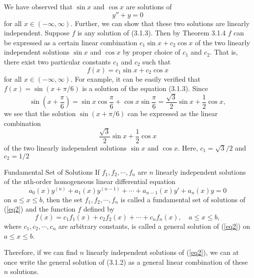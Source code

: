 \begin{example}{}{}
    We have observed that $\sin x$ and $\cos x$ are solutions of
    \begin{equation}
        y'' + y = 0
    \end{equation}
    for all $x \in (-\infty, \infty)$. Further, we can show that these two solutions are linearly independent. Suppose $f$ is any solution of (3.1.3). Then by Theorem 3.1.4 $f$ can be expressed as a certain linear combination $c_1\sin x + c_2\cos x$ of the two linearly independent solutions  $\sin x$ and $\cos x$ by proper choice of $c_1$ and $c_2$. That is, there exist two particular constants $c_1$ and $c_2$ such that
    \begin{equation}
        f(x) = c_1\sin x + c_2\cos x
    \end{equation}
    for all $x \in (-\infty,\infty)$. For example, it can be easily verified that $f(x) = \sin(x+\pi/6)$ is a solution of the equation (3.1.3). Since \[
        \sin \left( x + \frac{\pi}{6} \right) = \sin x \cos \frac{\pi}{6} + \cos x \sin \frac{\pi}{6} = \frac{\sqrt{3}}{2}\sin x + \frac{1}{2}\cos x,
    \] we see that the solution $\sin(x + \pi/6)$ can be expressed as the linear combination \[
        \frac{\sqrt{3}}{2}\sin x + \frac{1}{2}\cos x
    \] of the two linearly independent solutions $\sin x$ and $\cos x$. Here, $c_1 = \sqrt{3}/2$ and $c_2 = 1/2$
\end{example}

\begin{definition}{Fundamental Set of Solutions}{}
    If $f_1, f_2, \cdots, f_n$ are $n$ linearly independent solutions of the nth-order homogeneous linear differential equation
    \begin{equation}\tag{3.1.2}
        a_0(x)y^{(n)} + a_1(x)y^{(n-1)} + \cdots + a_{n-1}(x)y' + a_n(x)y = 0
    \end{equation}
    on $a \le x \le b$, then the set $f_1, f_2, \cdots, f_n$ is called a fundamental set of solutions of (\ref{eq2}) and the function $f$ defined by \[
        f(x) = c_1f_1(x) + c_2f_2(x) + \cdots + c_nf_n(x), \quad a \le x \le b,
    \] where $c_1, c_2, \cdots, c_n$ are arbitrary constants, is called a general solution of (\ref{eq2}) on  $a \le x \le b$.
\end{definition}

Therefore, if we can find $n$ linearly independent solutions of (\ref{eq2}), we can at once write the general solution of (3.1.2) as a general linear combination of these $n$ solutions.

